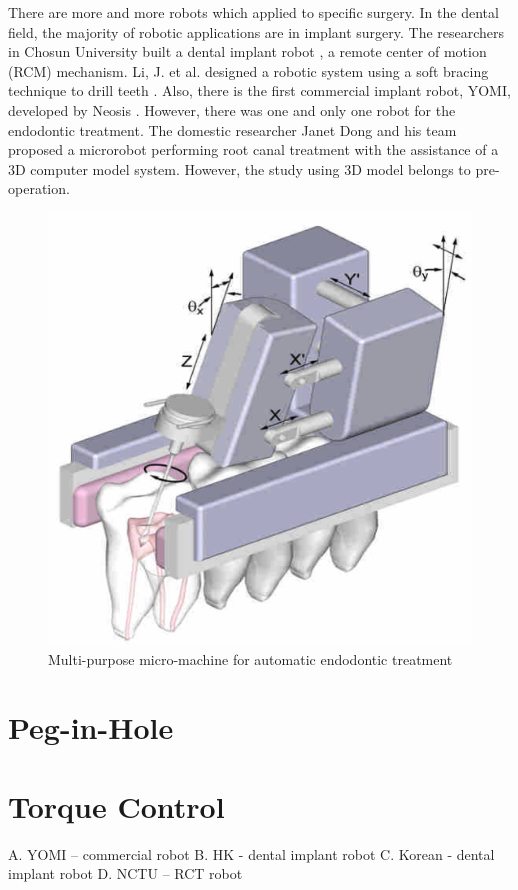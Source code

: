 There are more and more robots which applied to specific surgery. In the dental field, the majority of robotic applications are in implant surgery. The researchers in Chosun University built a dental implant robot \cite{Kim2009ASO}, a remote center of motion (RCM) mechanism. Li, J. et al. designed a robotic system using a soft bracing technique to drill teeth \cite{Li2019ACD}. Also, there is the first commercial implant robot, YOMI, developed by Neosis \cite{web3}. However, there was one and only one robot for the endodontic treatment. The domestic researcher Janet Dong and his team proposed a microrobot performing root canal treatment with the assistance of a 3D computer model system. However, the study using 3D model belongs to pre-operation.
\begin{figure}[htbp]
\begin{center}
\includegraphics[width=0.7\linewidth]{Images/NCTU_1.png}
\caption{
Multi-purpose micro-machine for automatic endodontic treatment
}\label{fig:NCTU_1}
\end{center}
\end{figure}
\section{Peg-in-Hole}
\section{Torque Control}
A.	YOMI – commercial robot
B.	HK - dental implant robot
C.	Korean - dental implant robot
D.	NCTU – RCT robot

